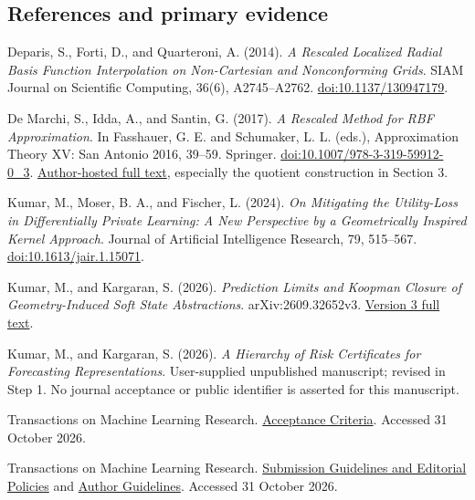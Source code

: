 \documentclass[11pt]{article}
\begin{document}
\subsection*{References and primary evidence}
\small
\begin{enumerate}[label={[\arabic*]},itemsep=9pt]
\item Deparis, S., Forti, D., and Quarteroni, A. (2014).
\emph{A Rescaled Localized Radial Basis Function Interpolation on
Non-Cartesian and Nonconforming Grids}. SIAM Journal on Scientific
Computing, 36(6), A2745--A2762.
\href{https://doi.org/10.1137/130947179}{doi:10.1137/130947179}.

\item De Marchi, S., Idda, A., and Santin, G. (2017).
\emph{A Rescaled Method for RBF Approximation}. In Fasshauer, G. E.
and Schumaker, L. L. (eds.), Approximation Theory XV: San Antonio 2016,
39--59. Springer.
\href{https://doi.org/10.1007/978-3-319-59912-0_3}{doi:10.1007/978-3-319-59912-0\_3}.
\href{https://www.math.unipd.it/~demarchi/papers/DeMarchi_Idda_Santin.pdf}{Author-hosted full text},
especially the quotient construction in Section 3.

\item Kumar, M., Moser, B. A., and Fischer, L. (2024).
\emph{On Mitigating the Utility-Loss in Differentially Private Learning:
A New Perspective by a Geometrically Inspired Kernel Approach}.
Journal of Artificial Intelligence Research, 79, 515--567.
\href{https://doi.org/10.1613/jair.1.15071}{doi:10.1613/jair.1.15071}.

\item Kumar, M., and Kargaran, S. (2026).
\emph{Prediction Limits and Koopman Closure of Geometry-Induced Soft
State Abstractions}. arXiv:2609.32652v3.
\href{https://arxiv.org/html/2609.32652v3}{Version 3 full text}.

\item Kumar, M., and Kargaran, S. (2026).
\emph{A Hierarchy of Risk Certificates for Forecasting Representations}.
User-supplied unpublished manuscript; revised in Step 1. No journal
acceptance or public identifier is asserted for this manuscript.

\item Transactions on Machine Learning Research.
\href{https://jmlr.org/tmlr/acceptance-criteria.html}{Acceptance Criteria}.
Accessed 31 October 2026.

\item Transactions on Machine Learning Research.
\href{https://jmlr.org/tmlr/editorial-policies.html}{Submission Guidelines
and Editorial Policies} and
\href{https://jmlr.org/tmlr/author-guide.html}{Author Guidelines}.
Accessed 31 October 2026.


\end{enumerate}
\end{document}
